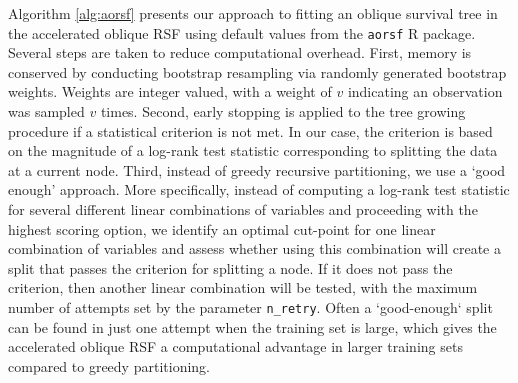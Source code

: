 \documentclass[twoside,11pt]{article}\usepackage[]{graphicx}\usepackage[]{xcolor}
\begin{document}
Algorithm \ref{alg:aorsf} presents our approach to fitting an oblique survival tree in the accelerated oblique RSF using default values from the \texttt{aorsf} R package. Several steps are taken to reduce computational overhead. First, memory is conserved by conducting bootstrap resampling via randomly generated bootstrap weights. Weights are integer valued, with a weight of $v$ indicating an observation was sampled $v$ times. Second, early stopping is applied to the tree growing procedure if a statistical criterion is not met. In our case, the criterion is based on the magnitude of a log-rank test statistic corresponding to splitting the data at a current node. Third, instead of greedy recursive partitioning, we use a `good enough' approach. More specifically, instead of computing a log-rank test statistic for several different linear combinations of variables and proceeding with the highest scoring option, we identify an optimal cut-point for one linear combination of variables and assess whether using this combination will create a split that passes the criterion for splitting a node. If it does not pass the criterion, then another linear combination will be tested, with the maximum number of attempts set by the parameter \texttt{n\_retry}. Often a `good-enough` split can be found in just one attempt when the training set is large, which gives the accelerated oblique RSF a computational advantage in larger training sets compared to greedy partitioning.
\end{document}
